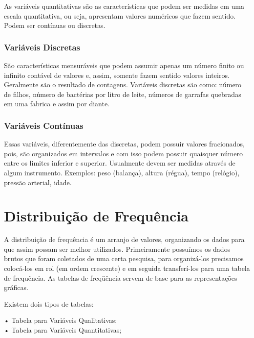 \documentclass[
	12pt,				%
	oneside,			%
	a4paper,			%
	english,			%
	french,				%
	spanish,			%
	brazil,				%
	]{abntex2}
\begin{document}
As variáveis quantitativas são as características que podem ser medidas em uma escala quantitativa, ou seja, apresentam valores numéricos que fazem sentido. Podem ser contínuas ou discretas.

\subsubsection{Variáveis Discretas}

São características mensuráveis que podem assumir apenas um número finito ou infinito contável de valores e, assim, somente fazem sentido valores inteiros. Geralmente são o resultado de contagens. Variáveis discretas são como: número de filhos, número de bactérias por litro de leite, números de garrafas quebradas em uma fabrica e assim por diante. \cite{variaveis}

\subsubsection{Variáveis Contínuas}

Essas variáveis, diferentemente das discretas, podem possuir valores fracionados, pois, são organizados em intervalos e com isso podem possuir quaisquer número entre os limites inferior e superior. Usualmente devem ser medidas através de algum instrumento. Exemplos: peso (balança), altura (régua), tempo (relógio), pressão arterial, idade. \cite{variaveis}

\newpage
\section[Distribuição de Frequência]{Distribuição de Frequência}

A distribuição de frequência é um arranjo de valores, organizando os dados para que assim possam ser melhor utilizados. Primeiramente possuímos os dados brutos que foram coletados de uma certa pesquisa, para organizá-los precisamos colocá-los em rol (em ordem crescente) e em seguida transferí-los para uma tabela de frequência. As tabelas de freqüência servem de base para as representações gráficas.

Existem dois tipos de tabelas: 

\begin{center}
•	Tabela para Variáveis Qualitativas;\\
•	Tabela para Variáveis Quantitativas;\\

\end{center}
\end{document}
